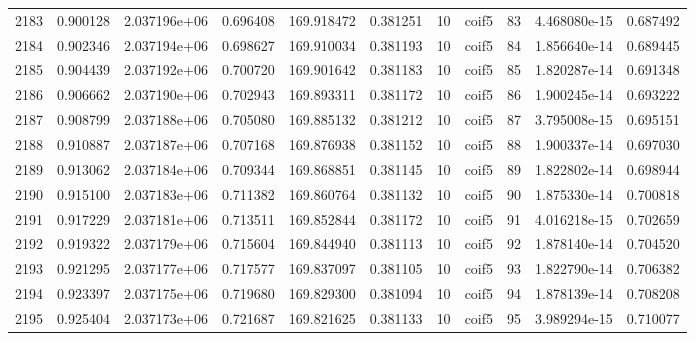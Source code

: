 \begin{tabular}{lrrrrrrlrrr}
2183 &    0.900128 &        2.037196e+06 &  0.696408 &              169.918472 &    0.381251 &      10 &        coif5 &     83 &   4.468080e-15 &      0.687492 \\
2184 &    0.902346 &        2.037194e+06 &  0.698627 &              169.910034 &    0.381193 &      10 &        coif5 &     84 &   1.856640e-14 &      0.689445 \\
2185 &    0.904439 &        2.037192e+06 &  0.700720 &              169.901642 &    0.381183 &      10 &        coif5 &     85 &   1.820287e-14 &      0.691348 \\
2186 &    0.906662 &        2.037190e+06 &  0.702943 &              169.893311 &    0.381172 &      10 &        coif5 &     86 &   1.900245e-14 &      0.693222 \\
2187 &    0.908799 &        2.037188e+06 &  0.705080 &              169.885132 &    0.381212 &      10 &        coif5 &     87 &   3.795008e-15 &      0.695151 \\
2188 &    0.910887 &        2.037187e+06 &  0.707168 &              169.876938 &    0.381152 &      10 &        coif5 &     88 &   1.900337e-14 &      0.697030 \\
2189 &    0.913062 &        2.037184e+06 &  0.709344 &              169.868851 &    0.381145 &      10 &        coif5 &     89 &   1.822802e-14 &      0.698944 \\
2190 &    0.915100 &        2.037183e+06 &  0.711382 &              169.860764 &    0.381132 &      10 &        coif5 &     90 &   1.875330e-14 &      0.700818 \\
2191 &    0.917229 &        2.037181e+06 &  0.713511 &              169.852844 &    0.381172 &      10 &        coif5 &     91 &   4.016218e-15 &      0.702659 \\
2192 &    0.919322 &        2.037179e+06 &  0.715604 &              169.844940 &    0.381113 &      10 &        coif5 &     92 &   1.878140e-14 &      0.704520 \\
2193 &    0.921295 &        2.037177e+06 &  0.717577 &              169.837097 &    0.381105 &      10 &        coif5 &     93 &   1.822790e-14 &      0.706382 \\
2194 &    0.923397 &        2.037175e+06 &  0.719680 &              169.829300 &    0.381094 &      10 &        coif5 &     94 &   1.878139e-14 &      0.708208 \\
2195 &    0.925404 &        2.037173e+06 &  0.721687 &              169.821625 &    0.381133 &      10 &        coif5 &     95 &   3.989294e-15 &      0.710077 \\

\end{tabular}
